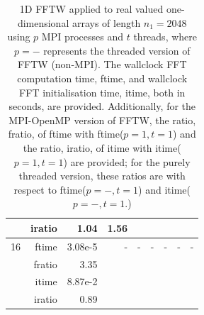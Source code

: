 \documentclass[a4]{article}
\begin{document}
\begin{table}
\begin{center}
\begin{tabular}{|r|r|r|r|r|r|r|r|r|}
      & iratio & 1.04 &    1.56    &  & & & & \\ \hline
    16 & ftime  & 3.08e-5 & - & - & - & - & - & - \\ 
     & fratio & 3.35 &  &  &  &  &  &  \\
      & itime &   8.87e-2   & & & & & & \\
      & iratio &   0.89  & & & & & & \\ \hline
\end{tabular}
\caption{1D FFTW applied to real valued one-dimensional arrays of length $n_1=2048$ using $p$ MPI processes and $t$ threads, where $p=-$ represents the threaded version of FFTW (non-MPI). The wallclock FFT computation time, ftime, and wallclock FFT initialisation time, itime, both in seconds, are provided. Additionally, for the MPI-OpenMP version of FFTW, the ratio, fratio, of ftime  with ftime($p=1,t=1$) and the ratio, iratio, of itime  with itime($p=1,t=1$) are provided; for the purely threaded version, these ratios are with respect to ftime($p=-,t=1$) and itime($p=-,t=1$.) }\label{Tbl:FFT1d2048}
\end{center}
\end{table}
\end{document}

